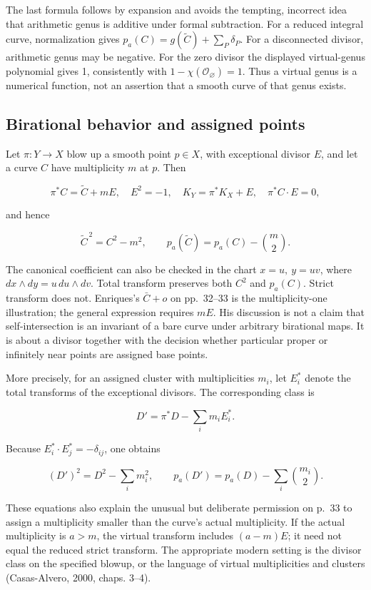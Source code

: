 The last formula follows by expansion and avoids the tempting, incorrect idea that arithmetic genus is additive under formal subtraction. For a reduced integral curve, normalization gives \(p_a(C)=g(\widetilde C)+\sum_P\delta_P\). For a disconnected divisor, arithmetic genus may be negative. For the zero divisor the displayed virtual-genus polynomial gives 1, consistently with \(1-\chi(\mathcal O_{\varnothing})=1\). Thus a virtual genus is a numerical function, not an assertion that a smooth curve of that genus exists.

\subsection{Birational behavior and assigned points}

Let \(\pi:Y\to X\) blow up a smooth point \(p\in X\), with exceptional divisor \(E\), and let a curve \(C\) have multiplicity \(m\) at \(p\). Then

\[
\pi^*C=\widetilde C+mE,\quad E^2=-1,\quad
K_Y=\pi^*K_X+E,\quad\pi^*C\cdot E=0,
\]

and hence

\[
\widetilde C^{\,2}=C^2-m^2,\qquad
p_a(\widetilde C)=p_a(C)-\binom m2.
\]

The canonical coefficient can also be checked in the chart \(x=u,\ y=uv\), where \(dx\wedge dy=u\,du\wedge dv\). Total transform preserves both \(C^2\) and \(p_a(C)\). Strict transform does not. Enriques's \(\bar C+o\) on pp.~32--33 is the multiplicity-one illustration; the general expression requires \(mE\). His discussion is not a claim that self-intersection is an invariant of a bare curve under arbitrary birational maps. It is about a divisor together with the decision whether particular proper or infinitely near points are assigned base points.

More precisely, for an assigned cluster with multiplicities \(m_i\), let \(E_i^*\) denote the total transforms of the exceptional divisors. The corresponding class is

\[
D'=\pi^*D-\sum_i m_iE_i^*.
\]

Because \(E_i^*\cdot E_j^*=-\delta_{ij}\), one obtains

\[
(D')^2=D^2-\sum_i m_i^2,\qquad
p_a(D')=p_a(D)-\sum_i\binom{m_i}{2}.
\]

These equations also explain the unusual but deliberate permission on p.~33 to assign a multiplicity smaller than the curve's actual multiplicity. If the actual multiplicity is \(a>m\), the virtual transform includes \((a-m)E\); it need not equal the reduced strict transform. The appropriate modern setting is the divisor class on the specified blowup, or the language of virtual multiplicities and clusters (Casas-Alvero, 2000, chaps. 3--4).

